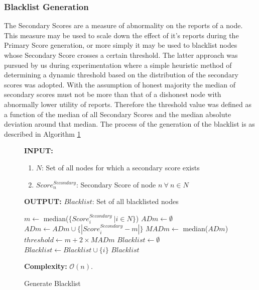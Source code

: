 \documentclass[journal]{IEEEtran}
\makeatletter
\newcommand{\removelatexerror}{\let\@latex@error\@gobble}
\makeatother
\begin{document}
\subsubsection{Blacklist Generation}
The Secondary Scores are a measure of abnormality on the reports of a node. This measure may be used to scale down the effect of it's reports during the Primary Score generation, or more simply it may be used to blacklist nodes whose Secondary Score crosses a certain threshold. The latter approach was pursued by us during experimentation where a simple heuristic method of determining a dynamic threshold based on the distribution of the secondary scores was adopted. With the assumption of honest majority the median of secondary scores must not be more than that of a dishonest node with abnormally lower utility of reports. Therefore the threshold value was defined as a function of the median of all Secondary Scores and the median absolute deviation around that median. The process of the generation of the blacklist is as described in %
Algorithm \ref {algo:BLKLGen} 
\begin{figure}[!t]\removelatexerror
	\label{fig:ALG_blklist}
\begin{algorithm}[H]
	\caption{Generate Blacklist}
	\label{algo:BLKLGen}
	\textbf{INPUT:}
		\begin{enumerate}
			\item $ N $: Set of all nodes for which a secondary score exists
			\item $Score^{Secondary}_n$: Secondary Score of node $n\ \forall\ n \in N$
		\end{enumerate}
	\textbf{OUTPUT:} $Blacklist$: Set of all blacklisted nodes
	\begin{algorithmic}[1]
		\STATE $ m \leftarrow  $ median($\{ Score^{Secondary}_i\ | i \in N\}$)
		\STATE $ ADm \leftarrow \emptyset $
		\STATE $ ADm \leftarrow ADm \cup \{ | Score^{Secondary}_i - m | \} $
		\ENDFOR
		\STATE $ MADm \leftarrow $ median($ADm$)
		\STATE $ threshold \leftarrow m+ 2\times MADm $ 
		\STATE $ Blacklist \leftarrow \emptyset $
				\STATE $ Blacklist \leftarrow Blacklist \cup \{ i \} $
			\ENDIF
		\ENDFOR
		\RETURN $ Blacklist $ 
	\end{algorithmic}
	\textbf{Complexity:} $\mathcal{O}(n)$.
\end{algorithm}
\end{figure}
\end{document}
